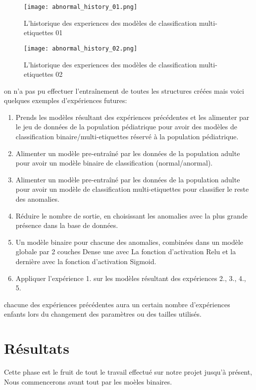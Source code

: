 \begin{figure}[H]
    \centering
    \texttt{[image: abnormal\_history\_01.png]}
    \caption{L'historique des experiences des modèles de classification multi-etiquettes 01}\label{fig:abnormal_history_01}
\end{figure}
\begin{figure}[H]
    \centering
    \texttt{[image: abnormal\_history\_02.png]}
    \caption{L'historique des experiences des modèles de classification multi-etiquettes 02}\label{fig:abnormal_history_02}
\end{figure}

on n'a pas pu effectuer l'entraînement de toutes les structures créées mais voici quelques exemples d'expériences futures:
\begin{enumerate}
    \item Prends les modèles résultant des expériences précédentes et les alimenter par le jeu de données de la population pédiatrique pour avoir des modèles de classification binaire/multi-etiquettes réservé à la population pédiatrique.
    \item Alimenter un modèle pre-entraîné par les données de la population adulte pour avoir un modèle binaire de classification (normal/anormal).
    \item Alimenter un modèle pre-entraîné par les données de la population adulte pour avoir un modèle de classification multi-etiquettes pour classifier le reste des anomalies.
    \item Réduire le nombre de sortie, en choisissant les anomalies avec la plus grande présence dans la base de données.
    \item Un modèle binaire pour chacune des anomalies, combinées dans un modèle globale par 2 couches Dense une avec La fonction d'activation Relu et la dernière avec la fonction d'activation Sigmoid.
    \item Appliquer l'expérience 1. sur les modèles résultant des expériences 2., 3., 4., 5.
\end{enumerate}

chacune des expériences précédentes aura un certain nombre d'expériences enfants lors du changement des paramètres ou des tailles utilisés.



\section{Résultats}
Cette phase est le fruit de tout le travail effectué sur notre projet jusqu'à présent, Nous commencerons avant tout par les moèles binaires.
